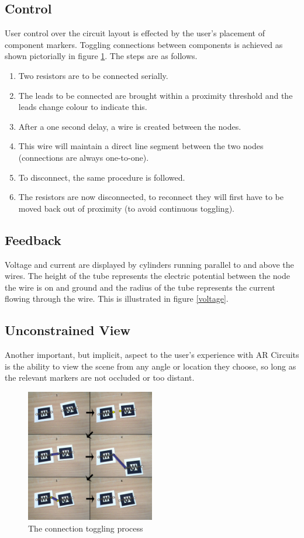\subsection{Control}
User control over the circuit layout is effected by the user's placement of component
markers. Toggling connections between components is achieved as shown
pictorially in figure \ref{connection}. The steps are as follows.
\begin{enumerate}
\item Two resistors are to be connected serially.
\item The leads to be connected are brought within a proximity threshold and the
leads change colour to indicate this.
\item After a one second delay, a wire is created between the nodes.
\item This wire will maintain a direct line segment between the two nodes
(connections are always one-to-one).
\item To disconnect, the same procedure is followed.
\item The resistors are now disconnected, to reconnect they will first have to
be moved back out of proximity (to avoid continuous toggling).
\end{enumerate}

\subsection{Feedback}
Voltage and current are displayed by cylinders running parallel to and above
the wires. The height of the tube represents the electric potential between the
node the wire is on and ground and the radius of the tube represents the current
flowing through the wire. This is illustrated in figure \ref{voltage}.


\subsection{Unconstrained View}
Another important, but implicit, aspect to the
user's experience with AR Circuits is the ability to view the scene from any
angle or location they choose, so long as the relevant markers are not occluded
or too distant.

\begin{figure}
\begin{center}
\includegraphics[width=0.50\textwidth]{connection}
\end{center}
\caption{The connection toggling process}
\label{connection}
\end{figure}

